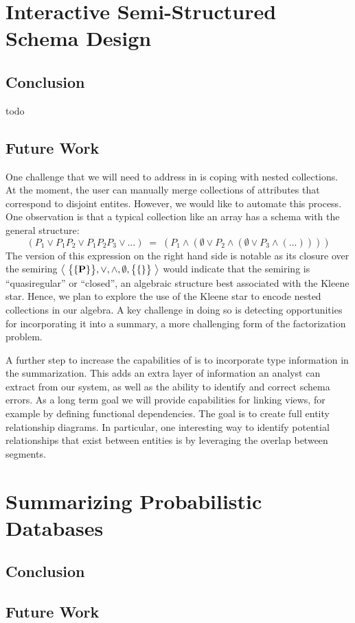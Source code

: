\section{Interactive Semi-Structured Schema Design}
\subsection{Conclusion}
todo
\subsection{Future Work}
One challenge that we will need to address in \systemnametwo is coping with nested collections.  
At the moment, the user can manually merge collections of attributes that correspond to disjoint entites.
However, we would like to automate this process.
One observation is that a typical collection like an array has a schema with the general structure:
$$(P_1 \vee P_1P_2 \vee P_1P_2P_3 \vee \ldots)\;=\;(P_1 \wedge (\emptyset \vee P_2 \wedge (\emptyset \vee P_3 \wedge (\ldots)) ))$$
The version of this expression on the right hand side is notable as its closure over the semiring $\left<\;{\big\{\{\mathbf P\}\big\}, \vee, \wedge, \emptyset, \big\{\{\}\big\}}\;\right>$ would indicate that the semiring is ``quasiregular'' or ``closed'', an algebraic structure best associated with the Kleene star.
Hence, we plan to explore the use of the Kleene star to encode nested collections in our algebra.
A key challenge in doing so is detecting opportunities for incorporating it into a summary, a more challenging form of the factorization problem.

A further step to increase the capabilities of \systemnametwo is to incorporate type information in the summarization. 
This adds an extra layer of information an analyst can extract from our system, as well as the ability to identify and correct schema errors. 
As a long term goal we will provide capabilities for linking views, for example by defining functional dependencies.
The goal is to create full entity relationship diagrams. 
In particular, one interesting way to identify potential relationships that exist between entities is by leveraging the overlap between segments.

\section{Summarizing Probabilistic Databases}
\subsection{Conclusion}
\subsection{Future Work}